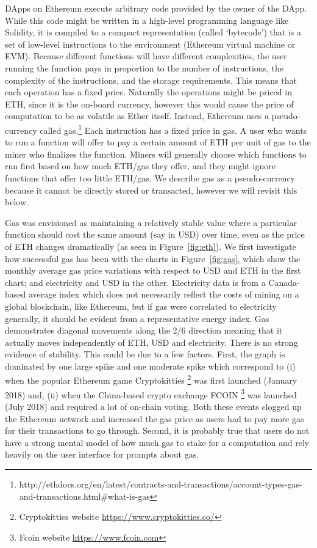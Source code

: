 DApps on Ethereum execute arbitrary code provided by the owner of the DApp. While this code might be written in a high-level programming language like Solidity, it is compiled to a compact representation (called `bytecode') that is a set of low-level instructions to the environment (Ethereum virtual machine or EVM). Because different functions will have different complexities, the user running the function pays in proportion to the number of instructions, the complexity of the instructions, and the storage requirements. This means that each operation has a fixed price. Naturally the operations might be priced in ETH, since it is the on-board currency, however this would cause the price of computation to be as volatile as Ether itself. Instead, Ethereum uses a pseudo-currency called gas.\footnote{http://ethdocs.org/en/latest/contracts-and-transactions/account-types-gas-and-transactions.html\#what-is-gas} Each instruction has a fixed price in gas. A user who wants to run a function will offer to pay a certain amount of ETH per unit of gas to the miner who finalizes the function. Miners will generally choose which functions to run first based on how much ETH/gas they offer, and they might ignore functions that offer too little ETH/gas. We describe gas as a pseudo-currency because it cannot be directly stored or transacted, however we will revisit this below.

Gas was envisioned as maintaining a relatively stable value where a particular function should cost the same amount (say in USD) over time, even as the price of ETH changes dramatically (as seen in Figure~\ref{fig:eth}). We first investigate how successful gas has been with the charts in Figure~\ref{fig:gas}, which show the monthly average gas price variations with respect to USD and ETH in the first chart; and electricity and USD in the other. Electricity data is from a Canada-based average index which does not necessarily reflect the costs of mining on a global blockchain, like Ethereum, but if gas were correlated to electricity generally, it should be evident from a representative energy index. Gas demonstrates diagonal movements along the 2/6 direction meaning that it actually moves independently of ETH, USD and electricity. There is no strong evidence of stability. This could be due to a few factors. First, the graph is dominated by one large spike and one moderate spike which correspond to (i) when the popular Ethereum game Cryptokitties \footnote{Cryptokitties website \url{https://www.cryptokitties.co/}} was first launched (January 2018) and, (ii) when the China-based crypto exchange FCOIN \footnote{Fcoin website \url{https://www.fcoin.com}} was launched (July 2018) and required a lot of on-chain voting. Both these events  clogged up the Ethereum network and increased the gas price as users had to pay more gas for their transactions to go through. Second, it is probably true that users do not have a strong mental model of how much gas to stake for a computation and rely heavily on the user interface for prompts about gas.

